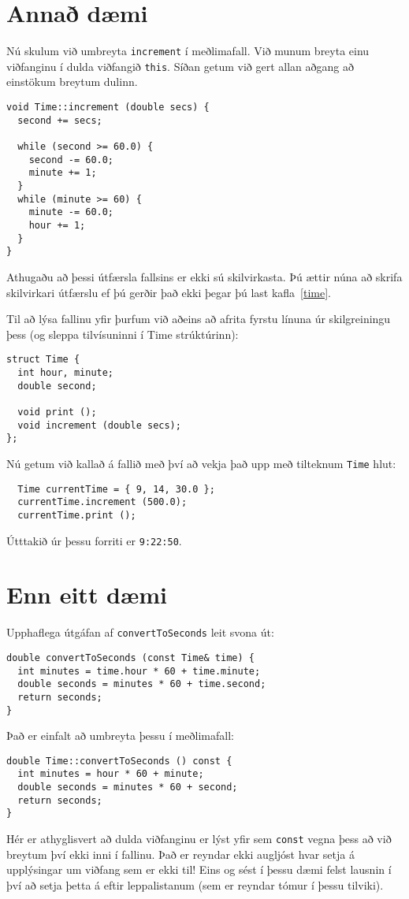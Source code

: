 \section {Annað dæmi}

Nú skulum við umbreyta {\tt increment} í meðlimafall.
Við munum breyta einu viðfanginu í dulda viðfangið {\tt this}.
Síðan getum við gert allan aðgang að einstökum breytum dulinn. 

\begin{verbatim}
void Time::increment (double secs) {
  second += secs;

  while (second >= 60.0) {
    second -= 60.0;
    minute += 1;
  }
  while (minute >= 60) {
    minute -= 60.0;
    hour += 1;
  }
}
\end{verbatim}
%
Athugaðu að þessi útfærsla fallsins er ekki sú skilvirkasta.
Þú ættir núna að skrifa skilvirkari útfærslu ef þú gerðir það ekki þegar þú last kafla~\ref{time}.

Til að lýsa fallinu yfir þurfum við aðeins að afrita fyrstu línuna úr skilgreiningu þess (og sleppa tilvísuninni í Time strúktúrinn):

\begin{verbatim}
struct Time {
  int hour, minute;
  double second;

  void print ();
  void increment (double secs);
};
\end{verbatim}
%
Nú getum við kallað á fallið með því að vekja það upp með tilteknum {\tt Time} hlut:

\begin{verbatim}
  Time currentTime = { 9, 14, 30.0 };
  currentTime.increment (500.0);
  currentTime.print ();
\end{verbatim}
%
Útttakið úr þessu forriti er {\tt 9:22:50}.

\section{Enn eitt dæmi}

Upphaflega útgáfan af {\tt convertToSeconds} leit svona út:

\begin{verbatim}
double convertToSeconds (const Time& time) {
  int minutes = time.hour * 60 + time.minute;
  double seconds = minutes * 60 + time.second;
  return seconds;
}
\end{verbatim}
%
Það er einfalt að umbreyta þessu í meðlimafall: 

\begin{verbatim}
double Time::convertToSeconds () const {
  int minutes = hour * 60 + minute;
  double seconds = minutes * 60 + second;
  return seconds;
}
\end{verbatim}
%
Hér er athyglisvert að dulda viðfanginu er lýst yfir sem 
{\tt const} vegna þess að við breytum því ekki inni í fallinu. 
Það er reyndar ekki augljóst hvar setja á upplýsingar um viðfang sem er ekki til!
Eins og sést í þessu dæmi felst lausnin í því að setja þetta á eftir leppalistanum (sem er reyndar tómur í þessu tilviki).

